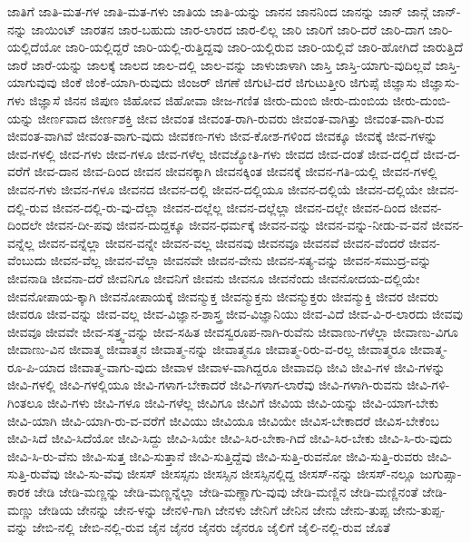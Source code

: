 {ಜಾತಿಗೆ
ಜಾತಿ-ಮತ-ಗಳ
ಜಾತಿ-ಮತ-ಗಳು
ಜಾತಿಯ
ಜಾತಿ-ಯನ್ನು
ಜಾನನ
ಜಾನನಿಂದ
ಜಾನನ್ನು
ಜಾನ್
ಜಾನ್ಗೆ
ಜಾನ್-ನನ್ನು
ಜಾಯಿಂಟ್
ಜಾರತನ
ಜಾರ-ಬಹುದು
ಜಾರ-ಲಾರದ
ಜಾರ-ಲಿಲ್ಲ
ಜಾರಿ
ಜಾರಿಗೆ
ಜಾರಿ-ದರೆ
ಜಾರಿ-ದಾಗ
ಜಾರಿ-ಯಲ್ಲಿದೆಯೋ
ಜಾರಿ-ಯಲ್ಲಿದ್ದರೆ
ಜಾರಿ-ಯಲ್ಲಿ-ರುತ್ತಿದ್ದವು
ಜಾರಿ-ಯಲ್ಲಿರುವ
ಜಾರಿ-ಯಲ್ಲಿವೆ
ಜಾರಿ-ಹೋಗಿದೆ
ಜಾರುತ್ತಿದೆ
ಜಾರೆ
ಜಾರೆ-ಯನ್ನು
ಜಾಲಕ್ಕೆ
ಜಾಲದ
ಜಾಲ-ದಲ್ಲಿ
ಜಾಲ-ವನ್ನು
ಜಾಳುಜಾಳಾಗಿ
ಜಾಸ್ತಿ
ಜಾಸ್ತಿ-ಯಾಗು-ವುದಿಲ್ಲವೆ
ಜಾಸ್ತಿ-ಯಾಗುವುವು
ಜಿಂಕೆ
ಜಿಂಕೆ-ಯಾಗಿ-ರುವುದು
ಜಿಂಜರ್
ಜಿಗಣೆ
ಜಿಗುಟಿ-ದರೆ
ಜಿಗುಟುತ್ತೀರಿ
ಜಿಗುಪ್ಸೆ
ಜಿಜ್ಞಾಸು
ಜಿಜ್ಞಾಸು-ಗಳು
ಜಿಜ್ಞಾಸೆ
ಜಿನನ
ಜಿಪುಣ
ಜಿಹೋವ
ಜಿಹೋವಾ
ಜೀಜ-ಗಣಿತ
ಜೀರು-ದುಂಬಿ
ಜೀರು-ದುಂಬಿಯ
ಜೀರು-ದುಂಬಿ-ಯನ್ನು
ಜೀರ್ಣವಾದ
ಜೀರ್ಣಶಕ್ತಿ
ಜೀವ
ಜೀವಂತ
ಜೀವಂತ-ರಾಗಿ-ರುವರು
ಜೀವಂತ-ವಾಗಿತ್ತು
ಜೀವಂತ-ವಾಗಿ-ರುವ
ಜೀವಂತ-ವಾಗಿವೆ
ಜೀವಂತ-ವಾಗು-ವುದು
ಜೀವಕಣ-ಗಳು
ಜೀವ-ಕೋಶ-ಗಳಿಂದ
ಜೀವಕ್ಕೂ
ಜೀವಕ್ಕೆ
ಜೀವ-ಗಳನ್ನು
ಜೀವ-ಗಳಲ್ಲಿ
ಜೀವ-ಗಳು
ಜೀವ-ಗಳೂ
ಜೀವ-ಗಳೆಲ್ಲ
ಜೀವಜ್ಯೋತಿ-ಗಳು
ಜೀವದ
ಜೀವ-ದಂತೆ
ಜೀವ-ದಲ್ಲಿದೆ
ಜೀವ-ದ-ವರೆಗೆ
ಜೀವ-ದಾನ
ಜೀವ-ದಿಂದ
ಜೀವನ
ಜೀವನಕ್ಕಾಗಿ
ಜೀವನಕ್ಕಿಂತ
ಜೀವನಕ್ಕೆ
ಜೀವನ-ಗತಿ-ಯಲ್ಲಿ
ಜೀವನ-ಗಳಲ್ಲಿ
ಜೀವನ-ಗಳು
ಜೀವನ-ಗಳೂ
ಜೀವನದ
ಜೀವನ-ದಲ್ಲಿ
ಜೀವನ-ದಲ್ಲಿಯೂ
ಜೀವನ-ದಲ್ಲಿಯೆ
ಜೀವನ-ದಲ್ಲಿಯೇ
ಜೀವನ-ದಲ್ಲಿ-ರುವ
ಜೀವನ-ದಲ್ಲಿ-ರು-ವು-ದೆಲ್ಲಾ
ಜೀವನ-ದಲ್ಲೆಲ್ಲ
ಜೀವನ-ದಲ್ಲೆಲ್ಲಾ
ಜೀವನ-ದಲ್ಲೇ
ಜೀವನ-ದಿಂದ
ಜೀವನ-ದಿಂದಲೇ
ಜೀವನ-ದೀ-ಪವು
ಜೀವನ-ದುದ್ದಕ್ಕೂ
ಜೀವನ-ಧರ್ಮಕ್ಕೆ
ಜೀವನ-ವನ್ನು
ಜೀವನ-ವನ್ನು-ನೀಡು-ವ-ವನೆ
ಜೀವನ-ವನ್ನೆಲ್ಲ
ಜೀವನ-ವನ್ನೆಲ್ಲಾ
ಜೀವನ-ವನ್ನೇ
ಜೀವನ-ವಲ್ಲ
ಜೀವನವು
ಜೀವನವೂ
ಜೀವನವೆ
ಜೀವನ-ವೆಂದರೆ
ಜೀವನ-ವೆಂಬುದು
ಜೀವನ-ವೆಲ್ಲ
ಜೀವನ-ವೆಲ್ಲಾ
ಜೀವನವೇ
ಜೀವನ-ವೇನು
ಜೀವನ-ಸತ್ಯ-ವನ್ನು
ಜೀವನ-ಸಮುದ್ರ-ವನ್ನು
ಜೀವನಾಡಿ
ಜೀವನಾ-ದರೆ
ಜೀವನಿಗೂ
ಜೀವನಿಗೆ
ಜೀವನು
ಜೀವನೂ
ಜೀವನೆಂದು
ಜೀವನೋದಯ-ದಲ್ಲಿಯೇ
ಜೀವನೋಪಾಯ-ಕ್ಕಾಗಿ
ಜೀವನೋಪಾಯಕ್ಕೆ
ಜೀವನ್ಮುಕ್ತ
ಜೀವನ್ಮುಕ್ತನು
ಜೀವನ್ಮುಕ್ತರು
ಜೀವನ್ಮುಕ್ತಿ
ಜೀವರ
ಜೀವರು
ಜೀವರೂ
ಜೀವ-ವನ್ನು
ಜೀವ-ವಲ್ಲ
ಜೀವ-ವಿಜ್ಞಾನ-ಶಾಸ್ತ್ರ
ಜೀವ-ವಿಜ್ಞಾನಿಯು
ಜೀವ-ವಿದೆ
ಜೀವ-ವಿ-ರ-ಲಾರದು
ಜೀವವು
ಜೀವವೂ
ಜೀವವೇ
ಜೀವ-ಸತ್ತ್ವ-ವನ್ನು
ಜೀವ-ಸಹಿತ
ಜೀವಸ್ವರೂಪ-ನಾಗಿ-ರುವೆನು
ಜೀವಾಣು-ಗಳೆಲ್ಲಾ
ಜೀವಾಣು-ವಿಗೂ
ಜೀವಾಣು-ವಿನ
ಜೀವಾತ್ಮ
ಜೀವಾತ್ಮನ
ಜೀವಾತ್ಮ-ನನ್ನು
ಜೀವಾತ್ಮನೂ
ಜೀವಾತ್ಮ-ರಿರು-ವ-ರಲ್ಲ
ಜೀವಾತ್ಮರೂ
ಜೀವಾತ್ಮ-ರೂ-ಪಿ-ಯಾದ
ಜೀವಾತ್ಮ-ವಾಗು-ವುದು
ಜೀವಾಳ
ಜೀವಾಳ-ವಾಗಿದ್ದರೂ
ಜೀವಾವಧಿ
ಜೀವಿ
ಜೀವಿ-ಗಳ
ಜೀವಿ-ಗಳನ್ನು
ಜೀವಿ-ಗಳಲ್ಲಿ
ಜೀವಿ-ಗಳಲ್ಲಿಯೂ
ಜೀವಿ-ಗಳಾಗ-ಬೇಕಾದರೆ
ಜೀವಿ-ಗಳಾಗ-ಲಾರೆವು
ಜೀವಿ-ಗಳಾಗಿ-ರುವನು
ಜೀವಿ-ಗಳಿ-ಗಿಂತಲೂ
ಜೀವಿ-ಗಳು
ಜೀವಿ-ಗಳೂ
ಜೀವಿ-ಗಳೆಲ್ಲ
ಜೀವಿಗೂ
ಜೀವಿಗೆ
ಜೀವಿಯ
ಜೀವಿ-ಯನ್ನು
ಜೀವಿ-ಯಾಗ-ಬೇಕು
ಜೀವಿ-ಯಾಗಿ
ಜೀವಿ-ಯಾಗಿ-ರು-ವ-ವರೆಗೆ
ಜೀವಿಯು
ಜೀವಿಯೂ
ಜೀವಿಯೇ
ಜೀವಿಸ-ಬೇಕಾದರೆ
ಜೀವಿಸ-ಬೇಕೆಂಬ
ಜೀವಿ-ಸಿದೆ
ಜೀವಿ-ಸಿದೆಯೋ
ಜೀವಿ-ಸಿದ್ದು
ಜೀವಿ-ಸಿಯೇ
ಜೀವಿ-ಸಿರ-ಬೇಕಾ-ಗಿದೆ
ಜೀವಿ-ಸಿರ-ಬೇಕು
ಜೀವಿ-ಸಿ-ರು-ವುದು
ಜೀವಿ-ಸಿ-ರು-ವೆನು
ಜೀವಿ-ಸುತ್ತ
ಜೀವಿ-ಸುತ್ತಾನೆ
ಜೀವಿ-ಸುತ್ತಿದ್ದೆವು
ಜೀವಿ-ಸುತ್ತಿ-ರುವನೋ
ಜೀವಿ-ಸುತ್ತಿ-ರುವರು
ಜೀವಿ-ಸುತ್ತಿ-ರುವೆವು
ಜೀವಿ-ಸು-ವೆವು
ಜೀಸಸ್
ಜೀಸಸ್ಸನು
ಜೀಸಸ್ಸಿನ
ಜೀಸಸ್ಸಿನಲ್ಲಿದ್ದ
ಜೀಸಸ್-ನನ್ನು
ಜೀಸಸ್-ನಲ್ಲೂ
ಜುಗುಪ್ಸಾ-ಕಾರಕ
ಜೇಡಿ
ಜೇಡಿ-ಮಣ್ಣನ್ನು
ಜೇಡಿ-ಮಣ್ಣನ್ನೆಲ್ಲಾ
ಜೇಡಿ-ಮಣ್ಣಾಗು-ವುವು
ಜೇಡಿ-ಮಣ್ಣಿನ
ಜೇಡಿ-ಮಣ್ಣಿನಂತೆ
ಜೇಡಿ-ಮಣ್ಣು
ಜೇಡಿಯ
ಜೇನನ್ನು
ಜೇನ-ಳನ್ನು
ಜೇನಳಿ-ಗಾಗಿ
ಜೇನಳು
ಜೇನಿಗೆ
ಜೇನಿನ
ಜೇನು
ಜೇನು-ತುಪ್ಪ
ಜೇನು-ತುಪ್ಪ-ವನ್ನು
ಜೇಬಿ-ನಲ್ಲಿ
ಜೇಬಿ-ನಲ್ಲಿ-ರುವ
ಜೈನ
ಜೈನರ
ಜೈನರು
ಜೈನರೂ
ಜೈಲಿಗೆ
ಜೈಲಿ-ನಲ್ಲಿ-ರುವ
ಜೊತೆ
}
